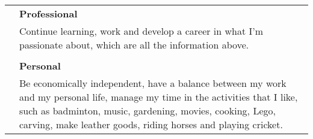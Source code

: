 \documentclass[letterpaper, 11pt]{article}
\begin{document}
\begin{longtable}{p{1.3in}p{4.8in}}

\nohyphens{\color{OliveGreen}{\textbf{\textit{Interests}}}}
& \textbf{Professional}\\
&Continue learning, work and develop a career in what I'm passionate about, which are all the information above. \\
&\\

&\textbf{Personal}\\
&Be economically independent, have a balance between my work and my personal life, manage my time in the activities that I like, such as badminton, music, gardening, movies, cooking, Lego, carving, make leather goods, riding horses and playing cricket.\\


\end{longtable}
\end{document}
